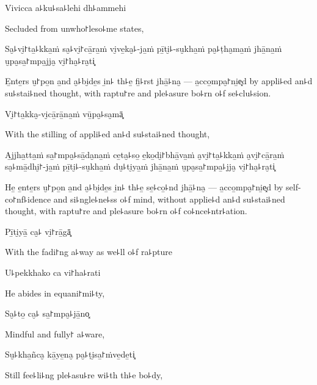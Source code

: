 Vivicca a꜕ku꜕sa꜕lehi dh꜕ammehi

\begin{english}
  Secluded from unwho꜓leso꜕me states,
\end{english}

Sa̮꜕vi̮꜓ta̱꜕kka̱ṁ sa̮꜕vi̮꜓cā̱ra̱ṁ vi̮ve̱ka̮꜕-ja̱ṁ pī̱ti̮꜕-su̮kha̱ṁ pa̮꜕ṭha̮ma̱ṁ jhā̱na̱ṁ u̮pa̮sa̱꜓mpa̱jja̮ vi̮꜓ha̮꜕ra̮ti͓

\begin{english}
  E̱nte̱rs u̮꜓po̱n a̱nd a̮꜕bi̮de̱s i̱n꜕ th꜕e̱ fi̱꜕rst jhā̱꜕na̮ --- a̱cco̱mpa̮꜓ni̱e͓d by
  appli꜕ed an꜕d su꜕stai꜕ned thought, with raptu꜓re and ple꜕asure bo꜕rn
  o꜕f se꜕clu꜕sion.
\end{english}

Vi̮꜓ta̱kka̮-vi̮cā̱rā̱na̱ṁ vū̱pa̮꜕sa̮mā͓

\begin{english}
  With the stilling of appli꜕ed an꜕d su꜕stai꜕ned thought,
\end{english}

A̱jjha̱tta̱ṁ sa̱꜓mpa̮꜕sā̱da̮na̱ṁ ce̱ta̮꜕so̱ e̱ko̱di̮꜓bhā̱va̱ṁ a̮vi̮꜓ta̱꜕kka̱ṁ a̮vi̮꜓cā̱ra̱ṁ sa̮꜕mā̱dhi̮꜓-ja̱ṁ pī̱ti̮꜕-su̮kha̱ṁ du̮꜕ti̮ya̱ṁ jhā̱na̱ṁ u̮pa̮sa̱꜓mpa̱꜕jja̮ vi̮꜓ha̮꜕ra̮ti͓

\begin{english}
  He̱ e̱nte̱rs u̮꜓po̱n a̱nd a̮꜕bi̮de̱s i̱n꜕ th꜕e̱ se̱꜕co̱꜕nd jhā̱꜕na̮ --- a̱cco̱mpa̮꜓ni̱e͓d
  by self-co꜓nf꜕idence and si꜕ngle꜕ne꜕ss o꜕f mind, without applie꜕d an꜕d
  su꜕stai꜕ned thought, with raptu꜓re and ple꜕asure bo꜕rn o꜕f
  co꜕nce꜕ntr꜕ation.
\end{english}

\clearpage

Pī̱ti̮yā̱ ca̮꜕ vi̮꜓rā̱gā͓

\begin{english}
  With the fadi꜓ng a꜕way as we꜕ll o꜕f ra꜕pture
\end{english}

U꜕pekkhako ca vi꜓ha꜕rati

\begin{english}
  He abides in equani꜓mi꜕ty,
\end{english}

Sa̮꜕to̱ ca̮꜕ sa̱꜓mpa̮꜕jā̱no͓

\begin{english}
  Mindful and fully꜓ a꜕ware,
\end{english}

Su̮꜕kha̱ñca̮ kā̱ye̱na̮ pa̮꜕ṭi̮sa̱꜓ṁve̱de̱ti͓

\begin{english}
  Still fee꜕li꜕ng ple꜕asu꜕re wi꜕th th꜕e bo꜕dy,
\end{english}

